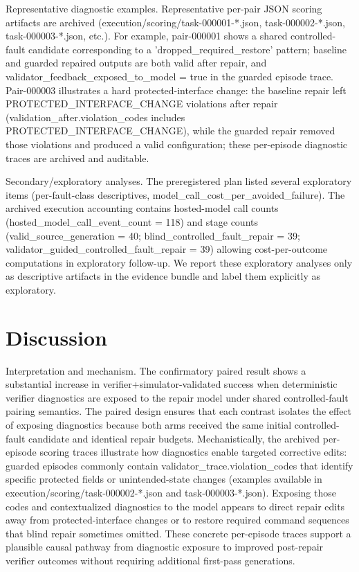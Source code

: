 \documentclass[conference]{IEEEtran}
\begin{document}
Representative diagnostic examples. Representative per-pair JSON scoring artifacts are archived (execution/scoring/task-000001-*.json, task-000002-*.json, task-000003-*.json, etc.). For example, pair-000001 shows a shared controlled-fault candidate corresponding to a 'dropped\_required\_restore' pattern; baseline and guarded repaired outputs are both valid after repair, and validator\_feedback\_exposed\_to\_model = true in the guarded episode trace. Pair-000003 illustrates a hard protected-interface change: the baseline repair left PROTECTED\_INTERFACE\_CHANGE violations after repair (validation\_after.violation\_codes includes PROTECTED\_INTERFACE\_CHANGE), while the guarded repair removed those violations and produced a valid configuration; these per-episode diagnostic traces are archived and auditable.

Secondary/exploratory analyses. The preregistered plan listed several exploratory items (per-fault-class descriptives, model\_call\_cost\_per\_avoided\_failure). The archived execution accounting contains hosted-model call counts (hosted\_model\_call\_event\_count = 118) and stage counts (valid\_source\_generation = 40; blind\_controlled\_fault\_repair = 39; validator\_guided\_controlled\_fault\_repair = 39) allowing cost-per-outcome computations in exploratory follow-up. We report these exploratory analyses only as descriptive artifacts in the evidence bundle and label them explicitly as exploratory.

\section{Discussion}
Interpretation and mechanism. The confirmatory paired result shows a substantial increase in verifier+simulator-validated success when deterministic verifier diagnostics are exposed to the repair model under shared controlled-fault pairing semantics. The paired design ensures that each contrast isolates the effect of exposing diagnostics because both arms received the same initial controlled-fault candidate and identical repair budgets. Mechanistically, the archived per-episode scoring traces illustrate how diagnostics enable targeted corrective edits: guarded episodes commonly contain validator\_trace.violation\_codes that identify specific protected fields or unintended-state changes (examples available in execution/scoring/task-000002-*.json and task-000003-*.json). Exposing those codes and contextualized diagnostics to the model appears to direct repair edits away from protected-interface changes or to restore required command sequences that blind repair sometimes omitted. These concrete per-episode traces support a plausible causal pathway from diagnostic exposure to improved post-repair verifier outcomes without requiring additional first-pass generations.
\end{document}
